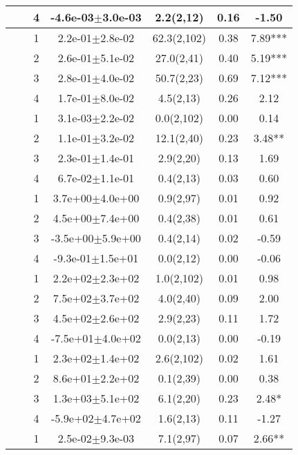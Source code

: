 \begin{longtable}{llccccS[table-format=-2.2, table-space-text-post = {***}]}
   &  & 4 & -4.6e-03$\pm$3.0e-03 & 2.2(2,12) & 0.16 & -1.50 \\ 
   \midrule
{} & {} & 1 &  2.2e-01$\pm$2.8e-02 & 62.3(2,102) & 0.38 & 7.89*** \\ 
   &  & 2 &  2.6e-01$\pm$5.1e-02 & 27.0(2,41) & 0.40 & 5.19*** \\ 
   &  & 3 &  2.8e-01$\pm$4.0e-02 & 50.7(2,23) & 0.69 & 7.12*** \\ 
   &  & 4 &  1.7e-01$\pm$8.0e-02 & 4.5(2,13) & 0.26 & 2.12 \\ 
   \midrule
{} & {} & 1 &  3.1e-03$\pm$2.2e-02 & 0.0(2,102) & 0.00 & 0.14 \\ 
   &  & 2 &  1.1e-01$\pm$3.2e-02 & 12.1(2,40) & 0.23 & 3.48** \\ 
   &  & 3 &  2.3e-01$\pm$1.4e-01 & 2.9(2,20) & 0.13 & 1.69 \\ 
   &  & 4 &  6.7e-02$\pm$1.1e-01 & 0.4(2,13) & 0.03 & 0.60 \\ 
   \midrule
{} & {} & 1 &  3.7e+00$\pm$4.0e+00 & 0.9(2,97) & 0.01 & 0.92 \\ 
   &  & 2 &  4.5e+00$\pm$7.4e+00 & 0.4(2,38) & 0.01 & 0.61 \\ 
   &  & 3 & -3.5e+00$\pm$5.9e+00 & 0.4(2,14) & 0.02 & -0.59 \\ 
   &  & 4 & -9.3e-01$\pm$1.5e+01 & 0.0(2,12) & 0.00 & -0.06 \\ 
   \midrule
{} & {} & 1 &  2.2e+02$\pm$2.3e+02 & 1.0(2,102) & 0.01 & 0.98 \\ 
   &  & 2 &  7.5e+02$\pm$3.7e+02 & 4.0(2,40) & 0.09 & 2.00 \\ 
   &  & 3 &  4.5e+02$\pm$2.6e+02 & 2.9(2,23) & 0.11 & 1.72 \\ 
   &  & 4 & -7.5e+01$\pm$4.0e+02 & 0.0(2,13) & 0.00 & -0.19 \\ 
   \midrule
{} & {} & 1 &  2.3e+02$\pm$1.4e+02 & 2.6(2,102) & 0.02 & 1.61 \\ 
   &  & 2 &  8.6e+01$\pm$2.2e+02 & 0.1(2,39) & 0.00 & 0.38 \\ 
   &  & 3 &  1.3e+03$\pm$5.1e+02 & 6.1(2,20) & 0.23 & 2.48* \\ 
   &  & 4 & -5.9e+02$\pm$4.7e+02 & 1.6(2,13) & 0.11 & -1.27 \\ 
   \midrule
{} & {} & 1 &  2.5e-02$\pm$9.3e-03 & 7.1(2,97) & 0.07 & 2.66** \\ 

\end{longtable}
